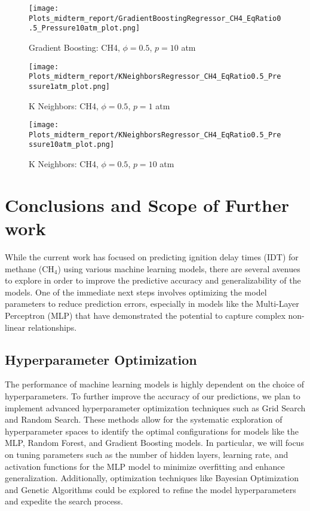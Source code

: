 \documentclass[12pt]{report}
\begin{document}
\begin{figure}[H]
    \centering
    \texttt{[image: Plots\_midterm\_report/GradientBoostingRegressor\_CH4\_EqRatio0.5\_Pressure10atm\_plot.png]}
    \caption{Gradient Boosting: CH4, $\phi = 0.5$, $p = 10$ atm}
\end{figure}


\begin{figure}[H]
    \centering
    \texttt{[image: Plots\_midterm\_report/KNeighborsRegressor\_CH4\_EqRatio0.5\_Pressure1atm\_plot.png]}
    \caption{K Neighbors: CH4, $\phi = 0.5$, $p = 1$ atm}
\end{figure}


\begin{figure}[H]
    \centering
    \texttt{[image: Plots\_midterm\_report/KNeighborsRegressor\_CH4\_EqRatio0.5\_Pressure10atm\_plot.png]}
    \caption{K Neighbors: CH4, $\phi = 0.5$, $p = 10$ atm}
\end{figure}








\chapter{Conclusions and Scope of Further work}

While the current work has focused on predicting ignition delay times (IDT) for methane (CH\(_4\)) using various machine learning models, there are several avenues to explore in order to improve the predictive accuracy and generalizability of the models. One of the immediate next steps involves optimizing the model parameters to reduce prediction errors, especially in models like the Multi-Layer Perceptron (MLP) that have demonstrated the potential to capture complex non-linear relationships.

\section{Hyperparameter Optimization}

The performance of machine learning models is highly dependent on the choice of hyperparameters. To further improve the accuracy of our predictions, we plan to implement advanced hyperparameter optimization techniques such as Grid Search and Random Search. These methods allow for the systematic exploration of hyperparameter spaces to identify the optimal configurations for models like the MLP, Random Forest, and Gradient Boosting models. In particular, we will focus on tuning parameters such as the number of hidden layers, learning rate, and activation functions for the MLP model to minimize overfitting and enhance generalization. Additionally, optimization techniques like Bayesian Optimization and Genetic Algorithms could be explored to refine the model hyperparameters and expedite the search process.
\end{document}
